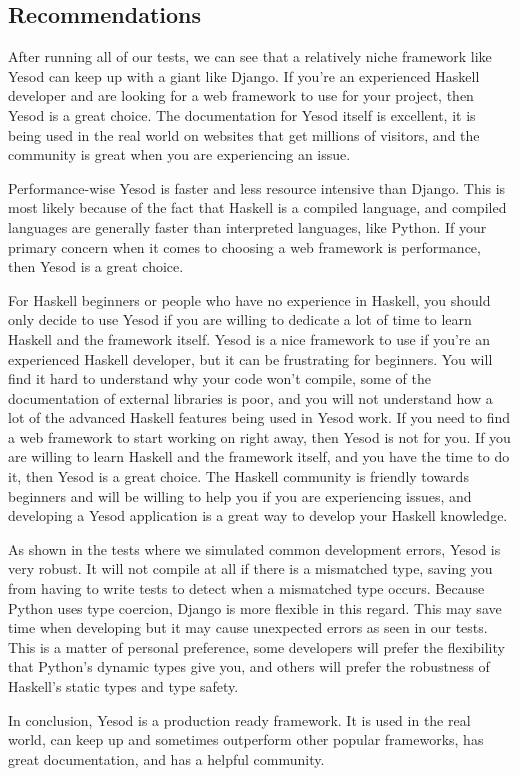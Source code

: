 \subsection{Recommendations}

After running all of our tests, we can see that a relatively niche framework
like Yesod can keep up with a giant like Django. If you're an experienced
Haskell developer and are looking for a web framework to use for your project,
then Yesod is a great choice. The documentation for Yesod itself is excellent,
it is being used in the real world on websites that get millions of visitors,
and the community is great when you are experiencing an issue.

Performance-wise Yesod is faster and less resource intensive than Django. This
is most likely because of the fact that Haskell is a compiled language, and
compiled languages are generally faster than interpreted languages, like Python.
If your primary concern when it comes to choosing a web framework is performance,
then Yesod is a great choice.

For Haskell beginners or people who have no experience in Haskell, you should
only decide to use Yesod if you are willing to dedicate a lot of time to learn
Haskell and the framework itself. Yesod is a nice framework to use if you're
an experienced Haskell developer, but it can be frustrating for beginners. You will
find it hard to understand why your code won't compile, some of the documentation
of external libraries is poor, and you will not understand how a lot of the
advanced Haskell features being used in Yesod work. If you need to find a web
framework to start working on right away, then Yesod is not for you. If you are
willing to learn Haskell and the framework itself, and you have the time to do
it, then Yesod is a great choice. The Haskell community is friendly towards
beginners and will be willing to help you if you are experiencing issues, and
developing a Yesod application is a great way to develop your Haskell knowledge.

As shown in the tests where we simulated common development errors, Yesod
is very robust. It will not compile at all if there is a mismatched type,
saving you from having to write tests to detect when a mismatched type
occurs. Because Python uses type coercion, Django is more flexible in
this regard. This may save time when developing but it may cause unexpected
errors as seen in our tests. This is a matter of personal preference, some
developers will prefer the flexibility that Python's dynamic types give
you, and others will prefer the robustness of Haskell's static types
and type safety.

In conclusion, Yesod is a production ready framework. It is used in the real
world, can keep up and sometimes outperform other popular frameworks,
has great documentation, and has a helpful community.
